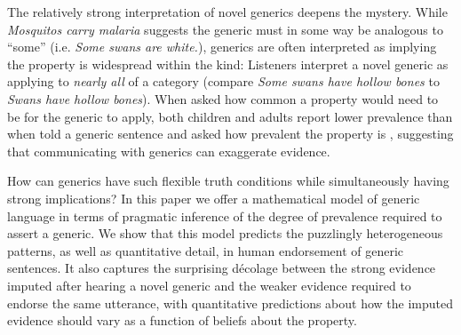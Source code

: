 \documentclass[10pt,letterpaper]{article}
\newcommand{\ndg}[1]{\textcolor{Green}{[ndg: #1]}}
\begin{document}

The relatively strong interpretation of novel generics deepens the mystery.
While \emph{Mosquitos carry malaria} suggests the generic must in some way be analogous to ``some'' (i.e. \emph{Some swans are white.}), generics are often interpreted as implying the property is widespread within the kind:
Listeners interpret a novel generic as applying to \emph{nearly all} of a category \cite{Gelman2002} (compare \emph{Some swans have hollow bones} to \emph{Swans have hollow bones}).
When asked how common a property would need to be for the generic to apply, both children and adults report lower prevalence than when told a generic sentence and asked how prevalent the property is \cite{Cimpian2010, Brandone2014}, suggesting that communicating with generics can exaggerate evidence.

How can generics have such flexible truth conditions while simultaneously having strong implications?
In this paper we offer a mathematical model of generic language in terms of pragmatic inference of the degree of prevalence required to assert a generic.  
We show that this model predicts the puzzlingly heterogeneous patterns, as well as quantitative detail, in human endorsement of generic sentences. 
It also captures the surprising d\'{e}colage \cite{Cimpian2010} between the strong evidence imputed after hearing a novel generic and the weaker evidence required to endorse the same utterance, with quantitative predictions about how the imputed evidence should vary as a function of beliefs about the property.


\end{document}
